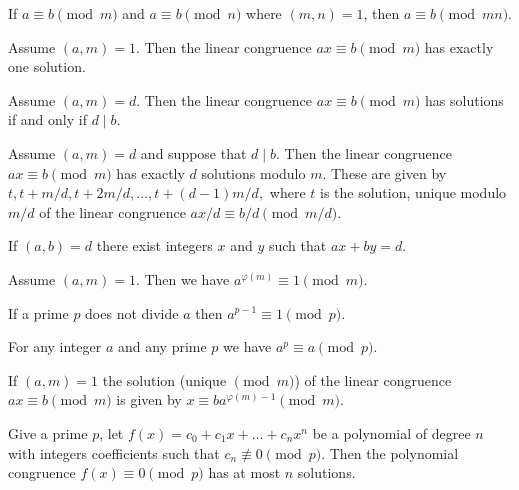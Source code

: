 \begin{theorem}
    If $a \equiv b \pmod{m}$ and $a \equiv b \pmod{n}$
    where $(m, n) = 1$, then $a \equiv b \pmod{mn}$.
\end{theorem}

\begin{theorem}
    Assume $(a, m) = 1$. Then the linear congruence
    $ax \equiv b \pmod{m}$ has exactly one solution.
\end{theorem}

\begin{theorem}
    Assume $(a, m) = d$. Then the linear congruence
    $ax \equiv b \pmod{m}$ has solutions if and only
    if $d \mid b$.
\end{theorem}

\begin{theorem}
    Assume $(a, m) = d$ and suppose that $d \mid b$.
    Then the linear congruence $ax \equiv b \pmod{m}$
    has exactly $d$ solutions modulo $m$. These are given by
    $t, t + m/d, t + 2m/d, \dots, t + (d - 1)m/d,$
    where $t$ is the solution, unique modulo $m/d$ of the
    linear congruence $ax/d \equiv b/d \pmod{m/d}$.
\end{theorem}

\begin{theorem}
    If $(a, b) = d$ there exist integers $x$ and $y$ such that
    $ax + by = d$.
\end{theorem}

\begin{theorem}
    Assume $(a, m) = 1$. Then we have
    $a^{\varphi(m)} \equiv 1 \pmod{m}$.
\end{theorem}

\begin{theorem}
    If a prime $p$ does not divide $a$ then
    $a^{p - 1} \equiv 1 \pmod{p}$.
\end{theorem}

\begin{theorem}
    For any integer $a$ and any prime $p$ we have
    $a^p \equiv a \pmod{p}$.
\end{theorem}

\begin{theorem}
    If $(a, m) = 1$ the solution (unique $\pmod{m}$)
    of the linear congruence
    $ax \equiv b \pmod{m}$
    is given by
    $x \equiv b a^{\varphi(m) - 1} \pmod{m}$.
\end{theorem}

\begin{theorem}[Lagrange]
    Give a prime $p$, let
    $f(x) = c_0 + c_1 x + \dots + c_n x^n$
    be a polynomial of degree $n$ with integers coefficients such that
    $c_n \not\equiv 0 \pmod{p}$.
    Then the polynomial congruence
    $f(x) \equiv 0 \pmod{p}$
    has at most $n$ solutions.
\end{theorem}

